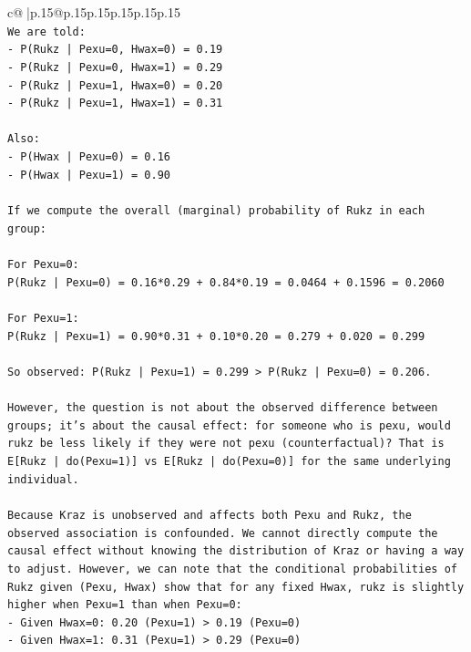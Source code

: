 \documentclass{article}
\begin{document}
{\begin{supertabular}{c@{$\;$}|p{.15\linewidth}@{}p{.15\linewidth}p{.15\linewidth}p{.15\linewidth}p{.15\linewidth}p{.15\linewidth}}
{{{\\ 
\texttt{We are told:} \\
\texttt{{-} P(Rukz | Pexu=0, Hwax=0) = 0.19} \\
\texttt{{-} P(Rukz | Pexu=0, Hwax=1) = 0.29} \\
\texttt{{-} P(Rukz | Pexu=1, Hwax=0) = 0.20} \\
\texttt{{-} P(Rukz | Pexu=1, Hwax=1) = 0.31} \\
\\ 
\texttt{Also:} \\
\texttt{{-} P(Hwax | Pexu=0) = 0.16} \\
\texttt{{-} P(Hwax | Pexu=1) = 0.90} \\
\\ 
\texttt{If we compute the overall (marginal) probability of Rukz in each group:} \\
\\ 
\texttt{For Pexu=0:} \\
\texttt{P(Rukz | Pexu=0) = 0.16*0.29 + 0.84*0.19 = 0.0464 + 0.1596 = 0.2060} \\
\\ 
\texttt{For Pexu=1:} \\
\texttt{P(Rukz | Pexu=1) = 0.90*0.31 + 0.10*0.20 = 0.279 + 0.020 = 0.299} \\
\\ 
\texttt{So observed: P(Rukz | Pexu=1) = 0.299 > P(Rukz | Pexu=0) = 0.206.} \\
\\ 
\texttt{However, the question is not about the observed difference between groups; it’s about the causal effect: for someone who is pexu, would rukz be less likely if they were not pexu (counterfactual)? That is E{[}Rukz | do(Pexu=1){]} vs E{[}Rukz | do(Pexu=0){]} for the same underlying individual.} \\
\\ 
\texttt{Because Kraz is unobserved and affects both Pexu and Rukz, the observed association is confounded. We cannot directly compute the causal effect without knowing the distribution of Kraz or having a way to adjust. However, we can note that the conditional probabilities of Rukz given (Pexu, Hwax) show that for any fixed Hwax, rukz is slightly higher when Pexu=1 than when Pexu=0:} \\
\texttt{{-} Given Hwax=0: 0.20 (Pexu=1) > 0.19 (Pexu=0)} \\
\texttt{{-} Given Hwax=1: 0.31 (Pexu=1) > 0.29 (Pexu=0)} \\
\\ 
}}}
\end{supertabular}}
\end{document}
